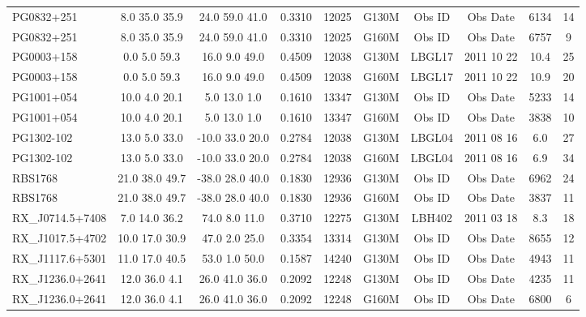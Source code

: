 \documentclass[iop]{emulateapj-rtx4}
\begin{document}
\begin{table}[ht]
\begin{center}
\begin{tabular}{l c c c c c c c c c}
PG0832+251  &              8.0  35.0  35.9  &    24.0  59.0  41.0  &    0.3310  & 12025  &   G130M  &   Obs ID  & Obs Date  & 6134  &       14         \\
PG0832+251  &              8.0  35.0  35.9  &    24.0  59.0  41.0  &    0.3310  & 12025  &   G160M  &   Obs ID  & Obs Date  & 6757  &       9          \\
PG0003+158  &              0.0  5.0  59.3  &     16.0  9.0  49.0  &     0.4509  & 12038  &   G130M  &   LBGL17  & 2011 10 22  &   10.4  &      25         \\
PG0003+158  &              0.0  5.0  59.3  &     16.0  9.0  49.0  &     0.4509  & 12038  &   G160M  &   LBGL17  & 2011 10 22  &   10.9  &      20         \\
PG1001+054  &              10.0  4.0  20.1  &    5.0  13.0  1.0  &      0.1610  & 13347  &   G130M  &   Obs ID  & Obs Date  & 5233  &       14         \\
PG1001+054  &              10.0  4.0  20.1  &    5.0  13.0  1.0  &      0.1610  & 13347  &   G160M  &   Obs ID  & Obs Date  & 3838  &       10         \\

PG1302-102  &              13.0  5.0  33.0  &    -10.0  33.0  20.0  &   0.2784  & 12038  &   G130M  &   LBGL04  & 2011 08 16  &     6.0  &       27         \\
PG1302-102  &              13.0  5.0  33.0  &    -10.0  33.0  20.0  &   0.2784  & 12038  &   G160M  &   LBGL04  & 2011 08 16  &     6.9  &       34         \\

RBS1768  &                 21.0  38.0  49.7  &   -38.0  28.0  40.0  &   0.1830  & 12936  &   G130M  &   Obs ID  & Obs Date  & 6962  &       24         \\
RBS1768  &                 21.0  38.0  49.7  &   -38.0  28.0  40.0  &   0.1830  & 12936  &   G160M  &   Obs ID  & Obs Date  & 3837  &       11         \\

RX\_J0714.5+7408  &         7.0  14.0  36.2  &    74.0  8.0  11.0  &     0.3710  & 12275  &   G130M  &   LBH402   & 2011 03 18   &     8.3  &       18         \\

RX\_J1017.5+4702  &         10.0  17.0  30.9  &   47.0  2.0  25.0  &     0.3354  & 13314  &   G130M  &   Obs ID  & Obs Date  & 8655  &       12         \\
RX\_J1117.6+5301  &         11.0  17.0  40.5  &   53.0  1.0  50.0  &     0.1587  & 14240  &   G130M  &   Obs ID  & Obs Date  & 4943  &       11         \\
RX\_J1236.0+2641  &         12.0  36.0  4.1  &    26.0  41.0  36.0  &    0.2092  & 12248  &   G130M  &   Obs ID  & Obs Date  & 4235  &       11         \\
RX\_J1236.0+2641  &         12.0  36.0  4.1  &    26.0  41.0  36.0  &    0.2092  & 12248  &   G160M  &   Obs ID  & Obs Date  & 6800  &       6          \\


\end{tabular}
\end{center}
\end{table}
\end{document}

